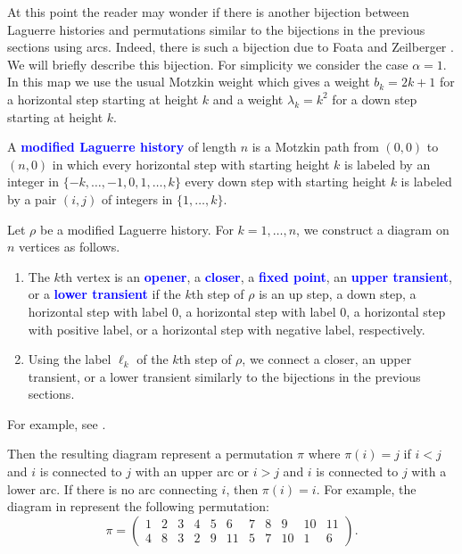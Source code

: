 \documentclass[oneside]{book}
\numberwithin{equation}{section}
\theoremstyle{definition}
\renewcommand\emph[1]{\textcolor{blue}{\bf #1}}
\begin{document}
\medskip

At this point the reader may wonder if there is another bijection between
Laguerre histories and permutations similar to the bijections in the
previous sections using arcs. Indeed, there is such a bijection due to
Foata and Zeilberger \cite{Foata1990a}. We will briefly describe this
bijection. For simplicity we consider the case \( \alpha=1 \). In this
map we use the usual Motzkin weight which gives a weight
\( b_k=2k+1 \) for a horizontal step starting at height \( k \) and a
weight \( \lambda_k=k^2 \) for a down step starting at height \( k \).

A \emph{modified Laguerre history} of length \( n \) is a Motzkin path
from \( (0,0) \) to \( (n,0) \) in which every horizontal step with
starting height \( k \) is labeled by an integer in
\( \{ -k,\dots,-1, 0, 1,\dots,k\} \) every down step with starting
height \( k \) is labeled by a pair \( (i,j) \) of integers in
\( \{ 1,\dots,k\} \).

Let \( \rho \) be a modified Laguerre history. For \( k= 1,\dots,n \),
we construct a diagram on \( n \) vertices as follows.
\begin{enumerate}
\item The \( k \)th vertex is an \emph{opener}, a \emph{closer}, a
  \emph{fixed point}, an \emph{upper transient}, or a \emph{lower
    transient} if the \( k \)th step of \( \rho \) is an up step, a
  down step, a horizontal step with label \( 0 \), a horizontal step
  with label \( 0 \), a horizontal step with positive label, or a
  horizontal step with negative label, respectively.
\item Using the label \( \ell_k \) of the \( k \)th step of
  \( \rho \), we connect a closer, an upper transient, or a lower
  transient similarly to the bijections in the previous sections.
\end{enumerate}

For example, see .

Then the resulting diagram represent a permutation \( \pi \) where
\( \pi(i)=j \) if \( i<j \) and \( i \) is connected to \( j \) with
an upper arc or \( i>j \) and \( i \) is connected to \( j \) with a
lower arc. If there is no arc connecting \( i \), then
\( \pi(i) = i \).
For example, the diagram in 
represent the following permutation:
\[
\pi = \begin{pmatrix}
1 & 2 & 3 & 4 & 5 & 6 & 7 & 8 & 9 & 10 & 11\\
4 & 8 & 3 & 2 & 9 & 11 & 5 & 7 & 10 & 1 & 6
\end{pmatrix}.
\]
\end{document}
